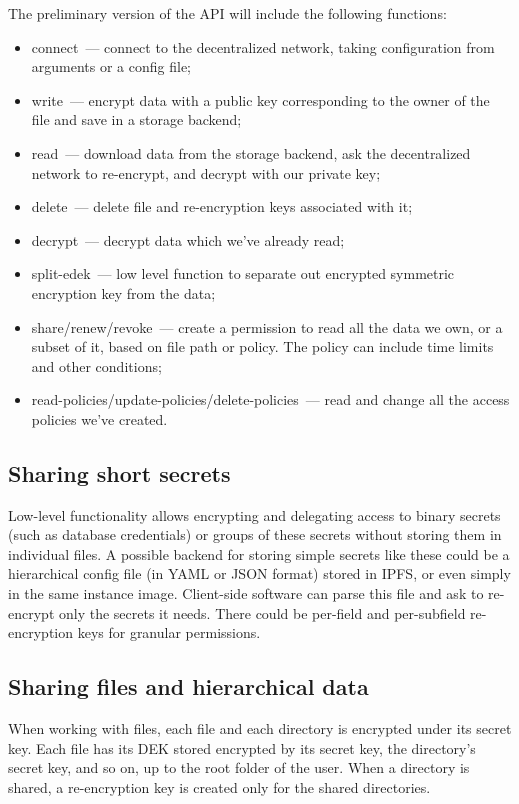 \documentclass[longbibliography,nofootinbib]{revtex4-1}
\begin{document}
The preliminary version of the API will include the following functions:
\begin{itemize}
    \item connect~--- connect to the decentralized network,
        taking configuration from arguments or a config file;
    \item write~--- encrypt data with a public key corresponding to the owner of the file and save in a storage backend;
    \item read~--- download data from the storage backend, ask the decentralized network to re-encrypt, and decrypt with our private key;
    \item delete~--- delete file and re-encryption keys associated with it;
    \item decrypt~--- decrypt data which we've already read;
    \item split-edek~--- low level function to separate out encrypted symmetric encryption key from the data;
    \item share/renew/revoke~--- create a permission to read all the data we own, or a subset of it, based on file path or policy.
        The policy can include time limits and other conditions;
    \item read-policies/update-policies/delete-policies~--- read and change all the access policies we've created.
\end{itemize}

\subsection{Sharing short secrets}

Low-level functionality allows encrypting and delegating access to binary secrets (such as database credentials) or groups of these secrets without
storing them in individual files.
A possible backend for storing simple secrets like these could be a hierarchical config file (in YAML or JSON format) stored in IPFS,
or even simply in the same instance image.
Client-side software can parse this file and ask to re-encrypt only the secrets it needs.
There could be per-field and per-subfield re-encryption keys for granular permissions.

\subsection{Sharing files and hierarchical data}
\label{sec:hierarchical-data}

When working with files, each file and each directory is encrypted under its secret key.
Each file has its DEK stored encrypted by its secret key, the directory's secret key, and so on, up to the root folder of the user.
When a directory is shared, a re-encryption key is created only for the shared directories.
\end{document}
